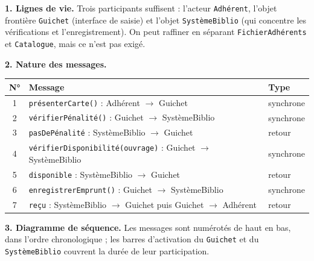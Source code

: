 \documentclass[11pt]{article}
\begin{document}
\begin{corrige}
\textbf{1. Lignes de vie.} Trois participants suffisent : l'acteur \texttt{Adhérent}, l'objet frontière \texttt{Guichet} (interface de saisie) et l'objet \texttt{SystèmeBiblio} (qui concentre les vérifications et l'enregistrement). On peut raffiner en séparant \texttt{FichierAdhérents} et \texttt{Catalogue}, mais ce n'est pas exigé.

\textbf{2. Nature des messages.}
\begin{center}
\begin{tabularx}{\linewidth}{|c|X|l|}
\hline
\rowcolor{popblueL} \textbf{N°} & \textbf{Message} & \textbf{Type} \\
\hline
1 & \texttt{présenterCarte()} : Adhérent $\to$ Guichet & synchrone \\
\hline
2 & \texttt{vérifierPénalité()} : Guichet $\to$ SystèmeBiblio & synchrone \\
\hline
3 & \texttt{pasDePénalité} : SystèmeBiblio $\to$ Guichet & retour \\
\hline
4 & \texttt{vérifierDisponibilité(ouvrage)} : Guichet $\to$ SystèmeBiblio & synchrone \\
\hline
5 & \texttt{disponible} : SystèmeBiblio $\to$ Guichet & retour \\
\hline
6 & \texttt{enregistrerEmprunt()} : Guichet $\to$ SystèmeBiblio & synchrone \\
\hline
7 & \texttt{reçu} : SystèmeBiblio $\to$ Guichet puis Guichet $\to$ Adhérent & retour \\
\hline
\end{tabularx}
\end{center}

\textbf{3. Diagramme de séquence.}
Les messages sont numérotés de haut en bas, dans l'ordre chronologique ; les barres d'activation du \texttt{Guichet} et du \texttt{SystèmeBiblio} couvrent la durée de leur participation.
\end{corrige}
\end{document}
